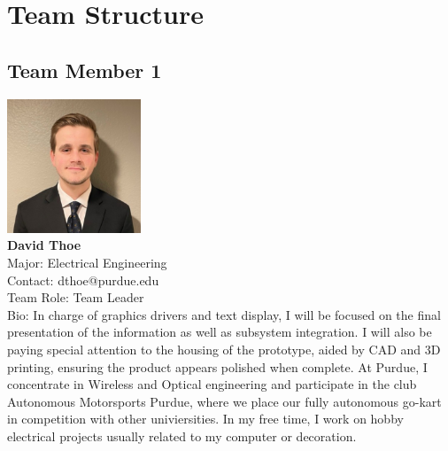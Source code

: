 
\clearpage
\section{Team Structure}
\subsection{Team Member 1}
\includegraphics[height=4cm]{images/david.jpg} \\
\textbf{David Thoe}\\
Major: Electrical Engineering\\
Contact: dthoe@purdue.edu\\
Team Role: Team Leader \\
Bio: In charge of graphics drivers and text display, I will be focused on the final presentation of the information as well as subsystem integration.
I will also be paying special attention to the housing of the prototype, aided by CAD and 3D printing, ensuring the product appears polished when complete.
At Purdue, I concentrate in Wireless and Optical engineering and participate in the club Autonomous Motorsports Purdue, where we place our fully autonomous go-kart in competition with other univiersities.
In my free time, I work on hobby electrical projects usually related to my computer or decoration.

